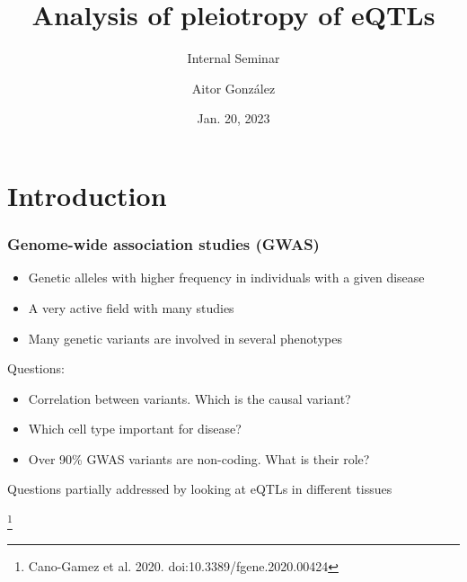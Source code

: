 \documentclass{beamer}
\title{Analysis of pleiotropy of eQTLs}
\subtitle{Internal Seminar}
\author{Aitor Gonz\'alez}
\institute{Aix Marseille Univ, INSERM, TAGC}
\date{Jan. 20, 2023}
\newcommand\blfootnote[1]{%
    \begingroup
    \renewcommand\thefootnote{}\footnote{#1}%
    \addtocounter{footnote}{-1}%
    \endgroup
}
\begin{document}
    \begin{frame}

        \titlepage

    \end{frame}

    \section{Introduction} %

    \begin{frame}
        \frametitle{Genome-wide association studies (GWAS)}

        \begin{itemize}
            \item Genetic alleles with higher frequency in individuals with a given disease
            \item A very active field with many studies
            \item Many genetic variants are involved in several phenotypes
        \end{itemize}
%
        \vfill
%
        Questions:
%
        \begin{itemize}
            \item Correlation between variants. Which is the causal variant?
            \item Which cell type important for disease?
            \item Over 90\% GWAS variants are non-coding. What is their role?
        \end{itemize}
%
        \vfill
%
        Questions partially addressed by looking at eQTLs in different tissues

        \blfootnote{Cano-Gamez et al. 2020. doi:10.3389/fgene.2020.00424}
    \end{frame}
\end{document}
